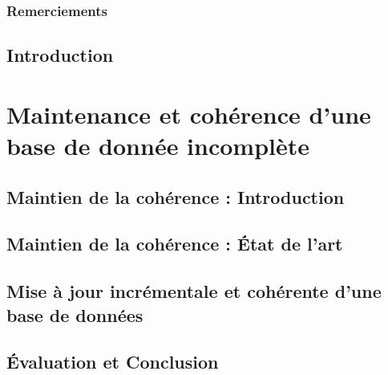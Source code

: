 
\pagestyle{fancy}


\frontmatter
\section*{Remerciements}
\lipsum[17-19]

\newpage

\dominitoc
\tableofcontents
{}
\listoffigures
{}
\listoftables

\mainmatter

\chapter{Introduction}



\part{Maintenance et cohérence d'une base de donnée incomplète}

\chapter{Maintien de la cohérence : Introduction}
\minitoc


\chapter{Maintien de la cohérence : État de l'art}
\minitoc


\chapter{Mise à jour incrémentale et cohérente d'une base de données}
\minitoc


\chapter{Évaluation et Conclusion}
\minitoc



